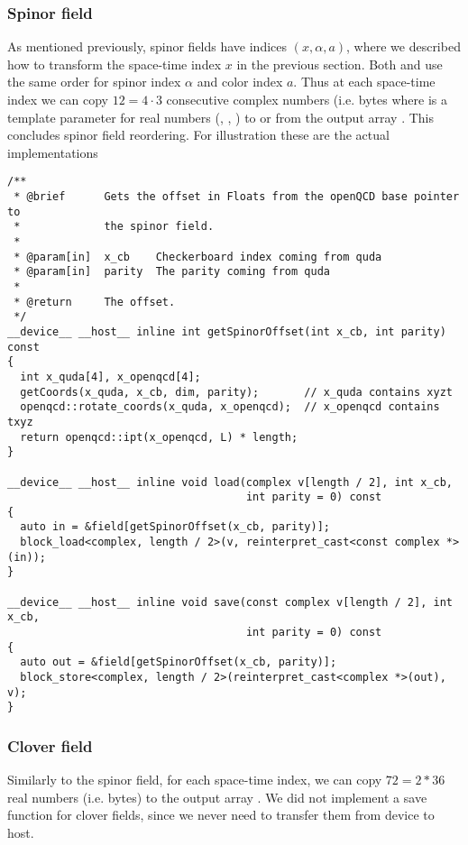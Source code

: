 \subsubsection{Spinor field}

As mentioned previously, spinor fields have indices $(x,\alpha,a)$, where we described how to transform the space-time index $x$ in the previous section. Both \quda and \openqxd use the same order for spinor index $\alpha$ and color index $a$. Thus at each space-time index we can copy $12=4 \cdot 3$ consecutive complex numbers (i.e.  bytes where  is a template parameter for real numbers (, , ) to or from the output array . This concludes spinor field reordering. For illustration these are the actual implementations
\begin{verbatim}
/**
 * @brief      Gets the offset in Floats from the openQCD base pointer to
 *             the spinor field.
 *
 * @param[in]  x_cb    Checkerboard index coming from quda
 * @param[in]  parity  The parity coming from quda
 *
 * @return     The offset.
 */
__device__ __host__ inline int getSpinorOffset(int x_cb, int parity) const
{
  int x_quda[4], x_openqcd[4];
  getCoords(x_quda, x_cb, dim, parity);       // x_quda contains xyzt
  openqcd::rotate_coords(x_quda, x_openqcd);  // x_openqcd contains txyz
  return openqcd::ipt(x_openqcd, L) * length;
}

__device__ __host__ inline void load(complex v[length / 2], int x_cb,
                                     int parity = 0) const
{
  auto in = &field[getSpinorOffset(x_cb, parity)];
  block_load<complex, length / 2>(v, reinterpret_cast<const complex *>(in));
}

__device__ __host__ inline void save(const complex v[length / 2], int x_cb,
                                     int parity = 0) const
{
  auto out = &field[getSpinorOffset(x_cb, parity)];
  block_store<complex, length / 2>(reinterpret_cast<complex *>(out), v);
}
\end{verbatim}

\subsubsection{Clover field}

Similarly to the spinor field, for each space-time index, we can copy $72 = 2*36$ real numbers (i.e.  bytes) to the output array .
We did not implement a save function for clover fields, since we never need to transfer them from device to host.

